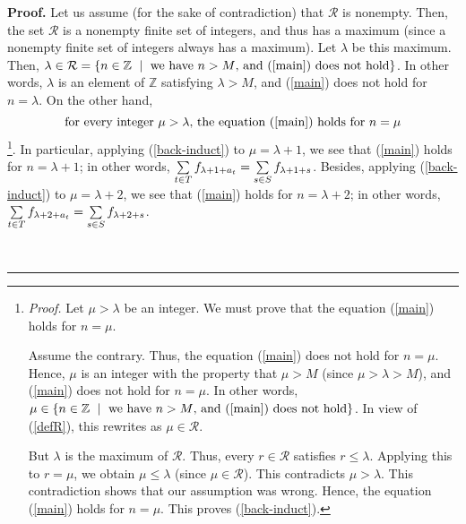 \documentclass[numbers=enddot,12pt,final,onecolumn,notitlepage]{scrartcl}%
\numberwithin{exer}{section}
\theoremstyle{definition}
\newenvironment{proof}[1][Proof]{\noindent\textbf{#1.} }{\ \rule{0.5em}{0.5em}}
\let\sumnonlimits\sum
\renewcommand{\sum}{\sumnonlimits\limits}
\begin{document}
\begin{proof}
Let us assume (for the sake of contradiction) that $\mathcal{R}$ is nonempty.
Then, the set $\mathcal{R}$ is a nonempty finite set of integers, and thus has
a maximum (since a nonempty finite set of integers always has a maximum). Let
$\lambda$ be this maximum. Then, $\lambda\in\mathcal{R}=\left\{
n\in\mathbb{Z}\ \mid\ \text{we have }n>M\text{, and (\ref{main}) does not
hold}\right\}  $. In other words, $\lambda$ is an element of $\mathbb{Z}$
satisfying $\lambda>M$, and (\ref{main}) does not hold for $n=\lambda$. On the
other hand,%
\begin{equation}
\text{for every integer }\mu>\lambda\text{, the equation (\ref{main}) holds
for }n=\mu\label{back-induct}%
\end{equation}
\footnote{\textit{Proof.} Let $\mu>\lambda$ be an integer. We must prove that
the equation (\ref{main}) holds for $n=\mu$.
\par
Assume the contrary. Thus, the equation (\ref{main}) does not hold for $n=\mu
$. Hence, $\mu$ is an integer with the property that $\mu>M$ (since
$\mu>\lambda>M$), and (\ref{main}) does not hold for $n=\mu$. In other words,
$\mu\in\left\{  n\in\mathbb{Z}\ \mid\ \text{we have }n>M\text{, and
(\ref{main}) does not hold}\right\}  $. In view of (\ref{defR}), this rewrites
as $\mu\in\mathcal{R}$.
\par
But $\lambda$ is the maximum of $\mathcal{R}$. Thus, every $r\in\mathcal{R}$
satisfies $r\leq\lambda$. Applying this to $r=\mu$, we obtain $\mu\leq\lambda$
(since $\mu\in\mathcal{R}$). This contradicts $\mu>\lambda$. This
contradiction shows that our assumption was wrong. Hence, the equation
(\ref{main}) holds for $n=\mu$. This proves (\ref{back-induct}).}. In
particular, applying (\ref{back-induct}) to $\mu=\lambda+1$, we see that
(\ref{main}) holds for $n=\lambda+1$; in other words, $\sum\limits_{t\in
T}f_{\lambda+1+a_{t}}=\sum\limits_{s\in S}f_{\lambda+1+s}$. Besides, applying
(\ref{back-induct}) to $\mu=\lambda+2$, we see that (\ref{main}) holds for
$n=\lambda+2$; in other words, $\sum\limits_{t\in T}f_{\lambda+2+a_{t}}%
=\sum\limits_{s\in S}f_{\lambda+2+s}$.


\end{proof}
\end{document}
